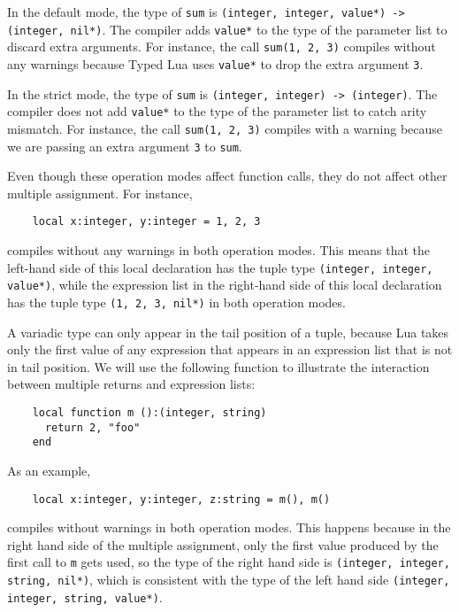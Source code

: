 In the default mode, the type of \texttt{sum} is
\texttt{(integer, integer, value*) -> (integer, nil*)}.
The compiler adds \texttt{value*} to the type of the parameter list
to discard extra arguments.
For instance, the call \texttt{sum(1, 2, 3)} compiles without any
warnings because Typed Lua uses \texttt{value*} to drop the extra
argument \texttt{3}.

In the strict mode, the type of \texttt{sum} is
\texttt{(integer, integer) -> (integer)}.
The compiler does not add \texttt{value*} to the type of the parameter
list to catch arity mismatch.
For instance, the call \texttt{sum(1, 2, 3)} compiles with a warning
because we are passing an extra argument \texttt{3} to \texttt{sum}.

Even though these operation modes affect function calls, they do not
affect other multiple assignment.
For instance,
\begin{verbatim}
    local x:integer, y:integer = 1, 2, 3
\end{verbatim}
compiles without any warnings in both operation modes.
This means that the left-hand side of this local declaration has the
tuple type \texttt{(integer, integer, value*)}, while the expression
list in the right-hand side of this local declaration has the
tuple type \texttt{(1, 2, 3, nil*)} in both operation modes.

A variadic type can only appear in the tail position of a tuple,
because Lua takes only the first value of any expression that appears
in an expression list that is not in tail position.
We will use the following function to illustrate the interaction
between multiple returns and expression lists:
\begin{verbatim}
    local function m ():(integer, string)
      return 2, "foo"
    end
\end{verbatim}

As an example,
\begin{verbatim}
    local x:integer, y:integer, z:string = m(), m()
\end{verbatim}
compiles without warnings in both operation modes.
This happens because in the right hand side of the multiple
assignment, only the first value produced by the first call
to \texttt{m} gets used, so the type of the right hand side
is \texttt{(integer, integer, string, nil*)}, which is
consistent with the type of the left hand side
\texttt{(integer, integer, string, value*)}.

